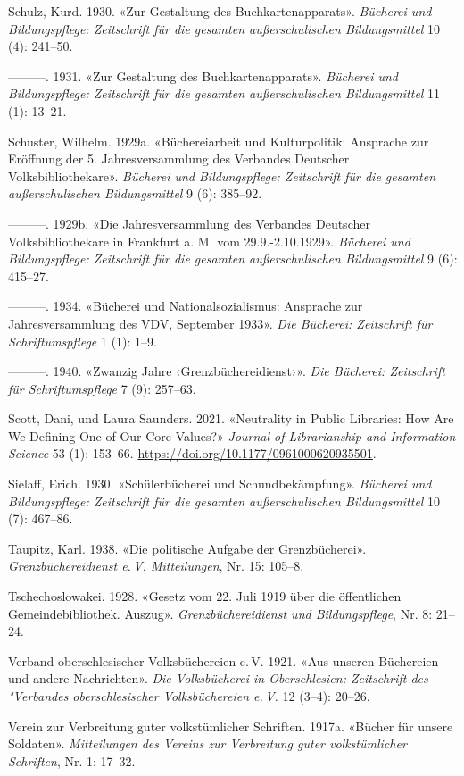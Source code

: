 \documentclass[a4paper,
fontsize=11pt,
oneside,
numbers=noperiodatend,
parskip=half-,
bibliography=totoc,
final
]{scrartcl}
\begin{document}
Schulz, Kurd. 1930. «Zur Gestaltung des Buchkartenapparats».
\emph{Bücherei und Bildungspflege: Zeitschrift für die gesamten
außerschulischen Bildungsmittel} 10 (4): 241--50.

---------. 1931. «Zur Gestaltung des Buchkartenapparats». \emph{Bücherei
und Bildungspflege: Zeitschrift für die gesamten außerschulischen
Bildungsmittel} 11 (1): 13--21.

Schuster, Wilhelm. 1929a. «Büchereiarbeit und Kulturpolitik: Ansprache
zur Eröffnung der 5. Jahresversammlung des Verbandes Deutscher
Volksbibliothekare». \emph{Bücherei und Bildungspflege: Zeitschrift für
die gesamten außerschulischen Bildungsmittel} 9 (6): 385--92.

---------. 1929b. «Die Jahresversammlung des Verbandes Deutscher
Volksbibliothekare in Frankfurt a. M. vom 29.9.-2.10.1929».
\emph{Bücherei und Bildungspflege: Zeitschrift für die gesamten
außerschulischen Bildungsmittel} 9 (6): 415--27.

---------. 1934. «Bücherei und Nationalsozialismus: Ansprache zur
Jahresversammlung des VDV, September 1933». \emph{Die Bücherei:
Zeitschrift für Schriftumspflege} 1 (1): 1--9.

---------. 1940. «Zwanzig Jahre ‹Grenzbüchereidienst›». \emph{Die
Bücherei: Zeitschrift für Schriftumspflege} 7 (9): 257--63.

Scott, Dani, und Laura Saunders. 2021. «Neutrality in Public Libraries:
How Are We Defining One of Our Core Values?» \emph{Journal of
Librarianship and Information Science} 53 (1): 153--66.
\url{https://doi.org/10.1177/0961000620935501}.

Sielaff, Erich. 1930. «Schülerbücherei und Schundbekämpfung».
\emph{Bücherei und Bildungspflege: Zeitschrift für die gesamten
außerschulischen Bildungsmittel} 10 (7): 467--86.

Taupitz, Karl. 1938. «Die politische Aufgabe der Grenzbücherei».
\emph{Grenzbüchereidienst e.\,V. Mitteilungen}, Nr. 15: 105--8.

Tschechoslowakei. 1928. «Gesetz vom 22. Juli 1919 über die öffentlichen
Gemeindebibliothek. Auszug». \emph{Grenzbüchereidienst und
Bildungspflege}, Nr. 8: 21--24.

Verband oberschlesischer Volksbüchereien e.\,V. 1921. «Aus unseren
Büchereien und andere Nachrichten». \emph{Die Volksbücherei in
Oberschlesien: Zeitschrift des "Verbandes oberschlesischer
Volksbüchereien e.\,V.} 12 (3--4): 20--26.

Verein zur Verbreitung guter volkstümlicher Schriften. 1917a. «Bücher
für unsere Soldaten». \emph{Mitteilungen des Vereins zur Verbreitung
guter volkstümlicher Schriften}, Nr. 1: 17--32.
\end{document}

